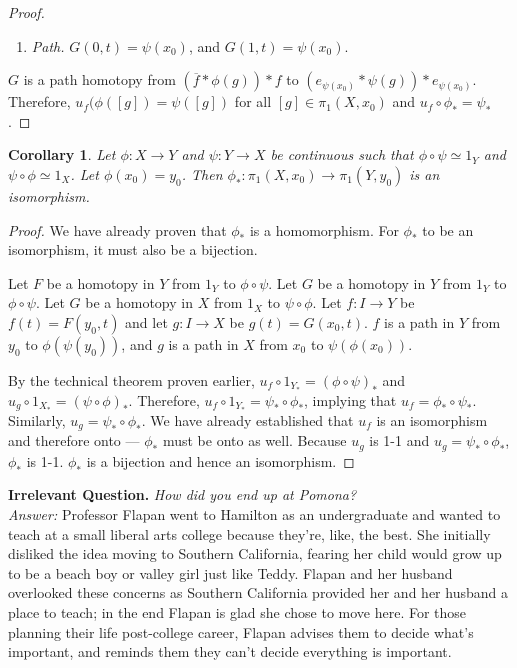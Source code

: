 \documentclass[11pt,reqno]{article}
\newtheorem{Corollary}{Corollary}
\theoremstyle{definition}
\begin{document}
\begin{proof}
\begin{enumerate}
$$\begin{array}{ll}
F(g(4s-1),1) &s\in\left[\frac{1}{4},\frac{1}{2}\right]\\ \\
f(2s) &s\in\left[\frac{1}{2},\frac{1}{2}\right]\\ \\
e_{\psi(x_0)} &s\in\left[\frac{1}{2},1\right]
\end{array}
\right.
$$
Thus, $G(s,1) = \left( e_{\psi(x_0)}*\psi(g)\right)*e_{\psi(x_0)}$.
\item \textit{Path.} $G(0,t)=\psi(x_0)$, and $G(1,t)=\psi(x_0)$.
\end{enumerate}
$G$ is a path homotopy from $\left(\overline{f}*\phi(g)\right)*f$ to $\left( e_{\psi(x_0)}*\psi(g)\right)*e_{\psi(x_0)}$. Therefore, $u_f(\phi([g])=\psi([g])$ for all $[g]\in\pi_1(X,x_0)$ and $u_f\circ\phi_*=\psi_*$.
\end{proof}
\begin{Corollary}
Let $\phi:X\rightarrow Y$ and $\psi:Y\rightarrow X$ be continuous such that $\phi\circ\psi \simeq 1_Y$ and $\psi\circ\phi \simeq 1_X$. Let $\phi(x_0)=y_0$. Then $\phi_*:\pi_1(X,x_0)\rightarrow \pi_1(Y,y_0)$ is an isomorphism.
\end{Corollary}
\begin{proof}
We have already proven that $\phi_*$ is a homomorphism. For $\phi_*$ to be an isomorphism, it must also be a bijection.

Let $F$ be a homotopy in $Y$ from $1_Y$ to $\phi\circ\psi$. Let $G$ be a homotopy in $Y$ from $1_Y$ to $\phi\circ\psi$. Let $G$ be a homotopy in $X$ from $1_X$ to $\psi\circ\phi$. Let $f:I\rightarrow Y$ be $f(t)=F(y_0,t)$ and let $g:I\rightarrow X$ be $g(t)=G(x_0,t)$. $f$ is a path in $Y$ from $y_0$ to $\phi(\psi(y_0))$, and $g$ is a path in $X$ from $x_0$ to $\psi(\phi(x_0))$.

By the technical theorem proven earlier, $u_f\circ 1_{Y_*}=(\phi\circ\psi)_*$ and $u_g\circ1_{X_*}=(\psi\circ\phi)_*$. Therefore, $u_f\circ1_{Y_*} = \psi_*\circ \phi_*$, implying that $u_f =\phi_*\circ\psi_*$. Similarly, $u_g = \psi_*\circ\phi_*$. We have already established that $u_f$ is an isomorphism and therefore onto --- $\phi_*$ must be onto as well. Because $u_g$ is 1-1 and $u_g=\psi_*\circ\phi_*$,  $\phi_*$ is 1-1. $\phi_*$ is a bijection and hence an isomorphism.
\end{proof}

\noindent\textbf{Irrelevant Question.} \textit{How did you end up at Pomona?}\\
\noindent\textit{Answer:} Professor Flapan went to Hamilton as an undergraduate and wanted to teach at a small liberal arts college because they're, like, the best. She initially disliked the idea moving to Southern California, fearing her child would grow up to be a beach boy or valley girl just like Teddy. Flapan and her husband overlooked these concerns as Southern California provided her and her husband a place to teach; in the end Flapan is glad she chose to move here. For those planning their life post-college career, Flapan advises them to decide what's important, and reminds them they can't decide everything is important. 
\end{document}
